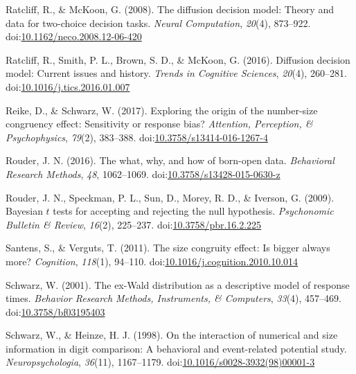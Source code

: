 \documentclass[english,man]{apa6}
\theoremstyle{definition}
\theoremstyle{definition}
\theoremstyle{definition}
\theoremstyle{remark}
\begin{document}
\hypertarget{ref-ratcliff2008}{}
Ratcliff, R., \& McKoon, G. (2008). The diffusion decision model: Theory
and data for two-choice decision tasks. \emph{Neural Computation},
\emph{20}(4), 873--922.
doi:\href{https://doi.org/10.1162/neco.2008.12-06-420}{10.1162/neco.2008.12-06-420}

\hypertarget{ref-ratcliff2016}{}
Ratcliff, R., Smith, P. L., Brown, S. D., \& McKoon, G. (2016).
Diffusion decision model: Current issues and history. \emph{Trends in
Cognitive Sciences}, \emph{20}(4), 260--281.
doi:\href{https://doi.org/10.1016/j.tics.2016.01.007}{10.1016/j.tics.2016.01.007}

\hypertarget{ref-reike2017}{}
Reike, D., \& Schwarz, W. (2017). Exploring the origin of the
number-size congruency effect: Sensitivity or response bias?
\emph{Attention, Perception, \& Psychophysics}, \emph{79}(2), 383--388.
doi:\href{https://doi.org/10.3758/s13414-016-1267-4}{10.3758/s13414-016-1267-4}

\hypertarget{ref-rouder2016}{}
Rouder, J. N. (2016). The what, why, and how of born-open data.
\emph{Behavioral Research Methods}, \emph{48}, 1062--1069.
doi:\href{https://doi.org/10.3758/s13428-015-0630-z}{10.3758/s13428-015-0630-z}

\hypertarget{ref-rouder2009}{}
Rouder, J. N., Speckman, P. L., Sun, D., Morey, R. D., \& Iverson, G.
(2009). Bayesian \(t\) tests for accepting and rejecting the null
hypothesis. \emph{Psychonomic Bulletin \& Review}, \emph{16}(2),
225--237.
doi:\href{https://doi.org/10.3758/pbr.16.2.225}{10.3758/pbr.16.2.225}

\hypertarget{ref-santens2011}{}
Santens, S., \& Verguts, T. (2011). The size congruity effect: Is bigger
always more? \emph{Cognition}, \emph{118}(1), 94--110.
doi:\href{https://doi.org/10.1016/j.cognition.2010.10.014}{10.1016/j.cognition.2010.10.014}

\hypertarget{ref-schwarz2001}{}
Schwarz, W. (2001). The ex-Wald distribution as a descriptive model of
response times. \emph{Behavior Research Methods, Instruments, \&
Computers}, \emph{33}(4), 457--469.
doi:\href{https://doi.org/10.3758/bf03195403}{10.3758/bf03195403}

\hypertarget{ref-schwarzHeinze1998}{}
Schwarz, W., \& Heinze, H. J. (1998). On the interaction of numerical
and size information in digit comparison: A behavioral and event-related
potential study. \emph{Neuropsychologia}, \emph{36}(11), 1167--1179.
doi:\href{https://doi.org/10.1016/s0028-3932(98)00001-3}{10.1016/s0028-3932(98)00001-3}
\end{document}
